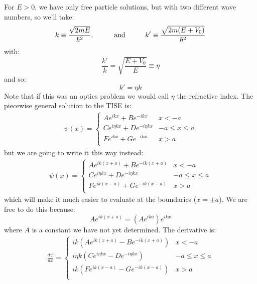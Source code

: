 \documentclass[12pt]{book}
\begin{document}
For $E>0$, we have only free particle solutions, but with two different wave numbers, so we'll take:
$$k \equiv \frac{\sqrt{2mE}}{\hbar^2}, \hspace{1cm }{\rm and} \hspace{1cm} k' \equiv \frac{\sqrt{2m(E+V_0)}}{\hbar^2}$$
with:
$$\frac{k'}{k} = \sqrt{\frac{E+V_0}{E}} \equiv \eta$$
and so:
$$k' = \eta k$$
Note that if this was an optics problem we would call $\eta$ the refractive index.  The piecewise general solution to the TISE is:
\begin{eqnarray*}
\psi(x) = \begin{cases}
A e^{\displaystyle ikx} + B e^{\displaystyle -ikx} & x < -a \\ 
C e^{\displaystyle i\eta kx} + D e^{\displaystyle -i\eta kx} & -a \leq x \leq a \\ 
F e^{\displaystyle ikx} + G e^{\displaystyle -ikx} & x > a \\ 
\end{cases}
\end{eqnarray*}
but we are going to write it this way instead:
\begin{eqnarray*}
\psi(x) = \begin{cases}
A e^{\displaystyle ik(x+a)} + B e^{\displaystyle -ik(x+a)} & x < -a \\ 
C e^{\displaystyle i\eta kx} + D e^{\displaystyle -i\eta kx} & -a \leq x \leq a \\ 
F e^{\displaystyle ik(x-a)} + G e^{\displaystyle -ik(x-a)} & x > a \\ 
\end{cases}
\end{eqnarray*}
which will make it much easier to evaluate at the boundaries ($x=\pm a$).  We are free to do this because:
$$A e^{ik(x+a)} = (A e^{ika}) e^{ikx}$$
where $A$ is a constant we have not yet determined.  The derivative is:
\begin{eqnarray*}
\frac{d\psi}{dx} = \begin{cases}
ik \left(Ae^{\displaystyle ik(x+a)} - B e^{\displaystyle -ik(x+a)}\right) & x < -a \\ 
i\eta k \left(Ce^{\displaystyle i\eta kx} - D e^{\displaystyle -i \eta k x}\right) & -a \leq x \leq a \\ 
ik \left(Fe^{\displaystyle ik(x-a)} - G e^{\displaystyle -ik(x-a)}\right) & x > a \\ 
\end{cases}
\end{eqnarray*}
\end{document}
